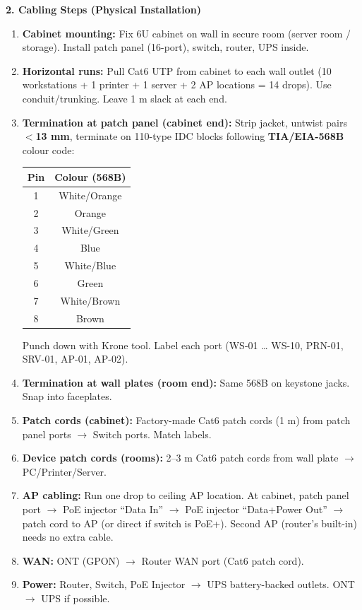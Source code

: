 \documentclass[11pt]{article}
\begin{document}
\begin{exoresolu}
\textbf{2. Cabling Steps (Physical Installation)}

\begin{enumerate}
\item \textbf{Cabinet mounting:} Fix 6U cabinet on wall in secure room (server room / storage). Install patch panel (16-port), switch, router, UPS inside.
\item \textbf{Horizontal runs:} Pull Cat6 UTP from cabinet to each wall outlet (10 workstations + 1 printer + 1 server + 2 AP locations = 14 drops). Use conduit/trunking. Leave 1 m slack at each end.
\item \textbf{Termination at patch panel (cabinet end):} Strip jacket, untwist pairs \textbf{$<$13 mm}, terminate on 110-type IDC blocks following \textbf{TIA/EIA-568B} colour code:
      \begin{center}
      \begin{tabular}{|c|c|}\hline
      \textbf{Pin} & \textbf{Colour (568B)} \\ \hline
      1 & White/Orange \\ \hline
      2 & Orange \\ \hline
      3 & White/Green \\ \hline
      4 & Blue \\ \hline
      5 & White/Blue \\ \hline
      6 & Green \\ \hline
      7 & White/Brown \\ \hline
      8 & Brown \\ \hline
      \end{tabular}
      \end{center}
      Punch down with Krone tool. Label each port (WS-01 … WS-10, PRN-01, SRV-01, AP-01, AP-02).
\item \textbf{Termination at wall plates (room end):} Same 568B on keystone jacks. Snap into faceplates.
\item \textbf{Patch cords (cabinet):} Factory-made Cat6 patch cords (1 m) from patch panel ports $\rightarrow$ Switch ports. Match labels.
\item \textbf{Device patch cords (rooms):} 2–3 m Cat6 patch cords from wall plate $\rightarrow$ PC/Printer/Server.
\item \textbf{AP cabling:} Run one drop to ceiling AP location. At cabinet, patch panel port $\rightarrow$ PoE injector ``Data In'' $\rightarrow$ PoE injector ``Data+Power Out'' $\rightarrow$ patch cord to AP (or direct if switch is PoE+). Second AP (router's built-in) needs no extra cable.
\item \textbf{WAN:} ONT (GPON) $\rightarrow$ Router WAN port (Cat6 patch cord).
\item \textbf{Power:} Router, Switch, PoE Injector $\rightarrow$ UPS battery-backed outlets. ONT $\rightarrow$ UPS if possible.
\end{enumerate}


\end{exoresolu}
\end{document}

